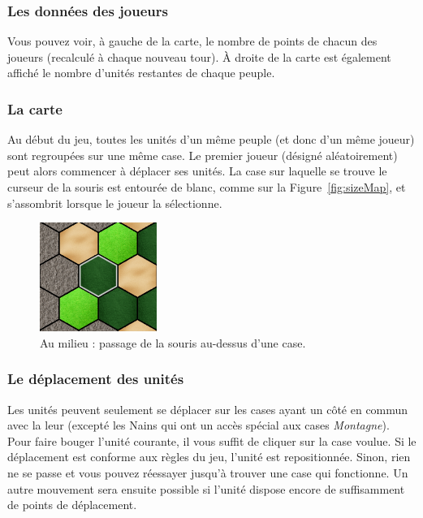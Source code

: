 \subsubsection{Les données des joueurs}

Vous pouvez voir, à gauche de la carte, le nombre de points de chacun des joueurs (recalculé à chaque nouveau tour). À droite de la carte est également affiché le nombre d'unités restantes de chaque peuple. 

\subsubsection{La carte}

Au début du jeu, toutes les unités d'un même peuple (et donc d'un même joueur) sont regroupées sur une même case. Le premier joueur (désigné aléatoirement) peut alors commencer à déplacer ses unités. La case sur laquelle se trouve le curseur de la souris est entourée de blanc, comme sur la {\sc Figure}~\ref{fig:sizeMap}, et s'assombrit lorsque le joueur la sélectionne.

\begin{figure}
    \centering
    \includegraphics[height=0.70\textwidth]{figure/selectSpace.png}
    \caption{Au milieu : passage de la souris au-dessus d'une case.}
    \label{fig:onSpace}
\end{figure}

\subsubsection{Le déplacement des unités}

Les unités peuvent seulement se déplacer sur les cases ayant un côté en commun avec la leur (excepté les Nains qui ont un accès spécial aux cases \textit{Montagne}). Pour faire bouger l'unité courante, il vous suffit de cliquer sur la case voulue. Si le déplacement est conforme aux règles du jeu, l'unité est repositionnée. Sinon, rien ne se passe et vous pouvez réessayer jusqu'à trouver une case qui fonctionne. Un autre mouvement sera ensuite possible si l'unité dispose encore de suffisamment de points de déplacement.

